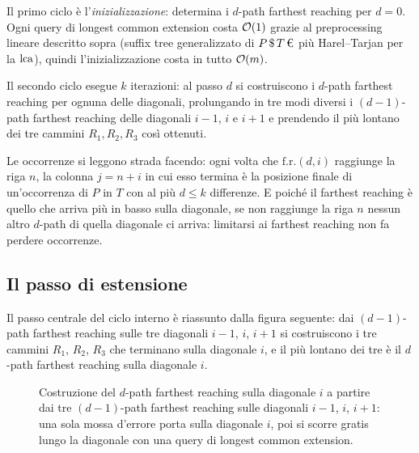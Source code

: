 Il primo ciclo è l'\emph{inizializzazione}: determina i $d$-path farthest
reaching per $d=0$. Ogni query di longest common extension costa $\mathcal{O}(1)$ grazie
al preprocessing lineare descritto sopra (suffix tree generalizzato di
$P\,\text{\$}\,T\,\text{\texteuro}$ più Harel--Tarjan per la $\operatorname{lca}$), quindi
l'inizializzazione costa in tutto $\mathcal{O}(m)$.

Il secondo ciclo esegue $k$ iterazioni: al passo $d$ si costruiscono i $d$-path
farthest reaching per ognuna delle diagonali, prolungando in tre modi diversi i
$(d-1)$-path farthest reaching delle diagonali $i-1$, $i$ e $i+1$ e prendendo il
più lontano dei tre cammini $R_1,R_2,R_3$ così ottenuti.

Le occorrenze si leggono strada facendo: ogni volta che $\mathrm{f.r.}(d,i)$
raggiunge la riga $n$, la colonna $j=n+i$ in cui esso termina è la posizione
finale di un'occorrenza di $P$ in $T$ con al più $d\le k$ differenze. E poiché
il farthest reaching è quello che arriva più in basso sulla diagonale, se non
raggiunge la riga $n$ nessun altro $d$-path di quella diagonale ci arriva:
limitarsi ai farthest reaching non fa perdere occorrenze.

\subsection{Il passo di estensione}

Il passo centrale del ciclo interno è riassunto dalla figura seguente: dai
$(d-1)$-path farthest reaching sulle tre diagonali $i-1$, $i$, $i+1$ si
costruiscono i tre cammini $R_1$, $R_2$, $R_3$ che terminano sulla diagonale
$i$, e il più lontano dei tre è il $d$-path farthest reaching sulla diagonale
$i$.

\begin{figure}[H]
  \centering
  
  \caption{Costruzione del $d$-path farthest reaching sulla diagonale $i$ a
  partire dai tre $(d-1)$-path farthest reaching sulle diagonali $i-1$, $i$,
  $i+1$: una sola mossa d'errore porta sulla diagonale $i$, poi si scorre gratis
  lungo la diagonale con una query di longest common extension.}
  \label{fig:lv-fr-tre-path}
\end{figure}

